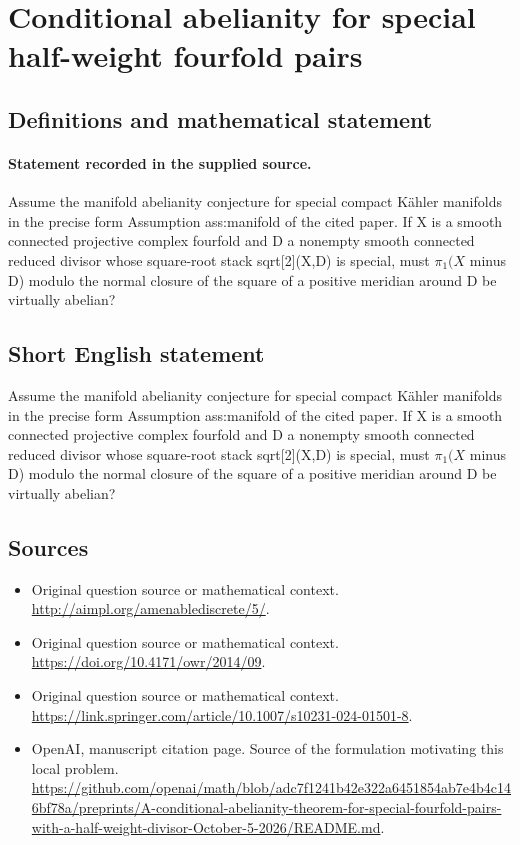 \documentclass[11pt]{article}
\begin{document}
\section*{Conditional abelianity for special half-weight fourfold pairs}\label{statement}
\subsection{Definitions and mathematical statement}
\paragraph{Statement recorded in the supplied source.}
Assume the manifold abelianity conjecture for special compact Kähler manifolds in the precise form Assumption ass:manifold of the cited paper. If X is a smooth connected projective complex fourfold and D a nonempty smooth connected reduced divisor whose square-root stack sqrt[2](X,D) is special, must $\pi _{1}(X$ minus D) modulo the normal closure of the square of a positive meridian around D be virtually abelian?
\subsection{Short English statement}
Assume the manifold abelianity conjecture for special compact Kähler manifolds in the precise form Assumption ass:manifold of the cited paper. If X is a smooth connected projective complex fourfold and D a nonempty smooth connected reduced divisor whose square-root stack sqrt[2](X,D) is special, must $\pi _{1}(X$ minus D) modulo the normal closure of the square of a positive meridian around D be virtually abelian?
\subsection{Sources}
\begin{itemize}
\item[S1] Original question source or mathematical context.
\url{http://aimpl.org/amenablediscrete/5/}.
\item[S2] Original question source or mathematical context.
\url{https://doi.org/10.4171/owr/2014/09}.
\item[S3] Original question source or mathematical context.
\url{https://link.springer.com/article/10.1007/s10231-024-01501-8}.
\item[S4] OpenAI, manuscript citation page. Source of the formulation motivating this local problem.
\url{https://github.com/openai/math/blob/adc7f1241b42e322a6451854ab7e4b4c146bf78a/preprints/A-conditional-abelianity-theorem-for-special-fourfold-pairs-with-a-half-weight-divisor-October-5-2026/README.md}.
\end{itemize}
\end{document}
